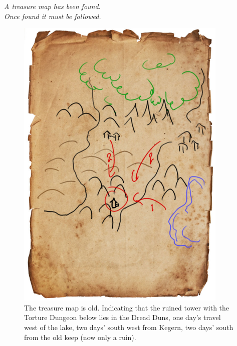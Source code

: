 \begin{center}
\textit{A treasure map has been found.\\ Once found it must be followed.}
\end{center}

\begin{figure}[h!]
  \centering
  \includegraphics[width=0.9\textwidth]{fig/treasure.jpg}
  \caption*{The treasure map is old. Indicating that the ruined tower with the Torture Dungeon below lies in the Dread Duns, one day's travel west of the lake, two days' south west from Kegern, two days' south from the old keep (now only a ruin).}
\end{figure}












\clearpage
\raggedbottom
